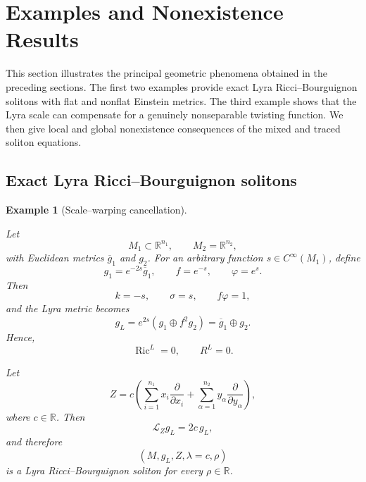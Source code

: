 \documentclass[a4paper,11pt]{article}
\theoremstyle{plain}
\newtheorem{example}{Example}[section]
\numberwithin{equation}{section}
\begin{document}
\section{Examples and Nonexistence Results}
\label{sec:examples-nonexistence}

This section illustrates the principal geometric phenomena obtained
in the preceding sections. The first two examples provide exact
Lyra Ricci--Bourguignon solitons with flat and nonflat Einstein
metrics. The third example shows that the Lyra scale can compensate
for a genuinely nonseparable twisting function. We then give local
and global nonexistence consequences of the mixed and traced
soliton equations.

\subsection{Exact Lyra Ricci--Bourguignon solitons}
\label{subsec:exact-lyra-solitons}

\begin{example}[Scale--warping cancellation]
	\label{ex:scale-warping-cancellation}
	
	Let
	\[
	M_{1}\subset\mathbb R^{n_{1}},
	\qquad
	M_{2}=\mathbb R^{n_{2}},
	\]
	with Euclidean metrics \(\overline g_{1}\) and \(g_{2}\).
	For an arbitrary function \(s\in C^{\infty}(M_{1})\), define
	\begin{equation}
		g_{1}=e^{-2s}\overline g_{1},
		\qquad
		f=e^{-s},
		\qquad
		\varphi=e^{s}.
		\label{eq:scale-cancellation-data}
	\end{equation}
	Then
	\[
	k=-s,
	\qquad
	\sigma=s,
	\qquad
	f\varphi=1,
	\]
	and the Lyra metric becomes
	\begin{equation}
		g_{L}
		=
		e^{2s}
		\left(
		g_{1}\oplus f^{2}g_{2}
		\right)
		=
		\overline g_{1}\oplus g_{2}.
		\label{eq:scale-cancellation-metric}
	\end{equation}
	Hence,
	\begin{equation}
		\operatorname{Ric}^{L}=0,
		\qquad
		R^{L}=0.
		\label{eq:scale-cancellation-curvature}
	\end{equation}
	
	Let
	\begin{equation}
		Z
		=
		c
		\left(
		\sum_{i=1}^{n_{1}}
		x_{i}\frac{\partial}{\partial x_{i}}
		+
		\sum_{\alpha=1}^{n_{2}}
		y_{\alpha}\frac{\partial}{\partial y_{\alpha}}
		\right),
		\label{eq:scale-cancellation-potential}
	\end{equation}
	where \(c\in\mathbb R\). Then
	\[
	\mathcal L_{Z}g_{L}=2c\,g_{L},
	\]
	and therefore
	\[
	\left(
	M,g_{L},Z,\lambda=c,\rho
	\right)
	\]
	is a Lyra Ricci--Bourguignon soliton for every
	\(\rho\in\mathbb R\).
\end{example}
\end{document}
